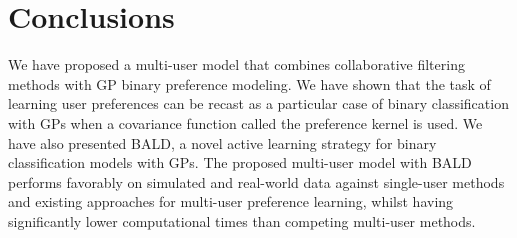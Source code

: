 \section{Conclusions\label{sec:conclusions}}

We have proposed a multi-user model that combines collaborative filtering methods
with GP binary preference modeling.
We have shown that the task of learning user preferences can be recast as a particular case of binary classification with GPs
when a covariance function called the preference kernel is used.
We have also presented BALD,
a novel active learning strategy for binary classification models with GPs. The proposed multi-user model with BALD performs favorably on simulated and real-world data against single-user methods
and existing approaches for multi-user preference learning, whilst having significantly lower computational times than competing multi-user methods.
